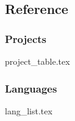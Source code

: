 \subsection{Reference}
\subsubsection{Projects}
\begin{center}
	{project_table.tex}
\end{center}

\subsubsection{Languages} \label{cs_languages}
\begin{multicols}{3}
	{lang_list.tex}
\end{multicols}
